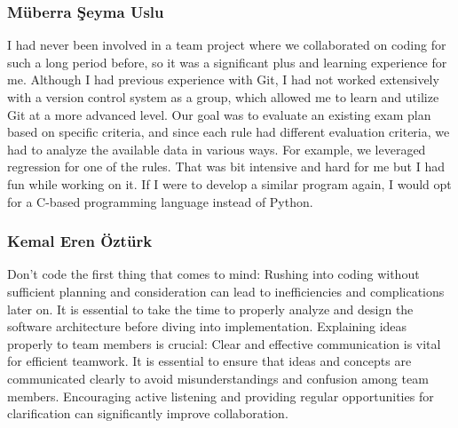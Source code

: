 \subsubsection{Müberra Şeyma Uslu}

I had never been involved in a team project where we collaborated on coding for such a long period before, so it was a significant plus and learning experience for me. Although I had previous experience with Git, I had not worked extensively with a version control system as a group, which allowed me to learn and utilize Git at a more advanced level. Our goal was to evaluate an existing exam plan based on specific criteria, and since each rule had different evaluation criteria, we had to analyze the available data in various ways. For example, we leveraged regression for one of the rules. That was bit intensive and hard for me but I had fun while working on it. If I were to develop a similar program again, I would opt for a C-based programming language instead of Python.


\subsubsection{Kemal Eren Öztürk}

Don't code the first thing that comes to mind: Rushing into coding without sufficient planning and consideration can lead to inefficiencies and complications later on. It is essential to take the time to properly analyze and design the software architecture before diving into implementation.
Explaining ideas properly to team members is crucial: Clear and effective communication is vital for efficient teamwork. It is essential to ensure that ideas and concepts are communicated clearly to avoid misunderstandings and confusion among team members. Encouraging active listening and providing regular opportunities for clarification can significantly improve collaboration.


